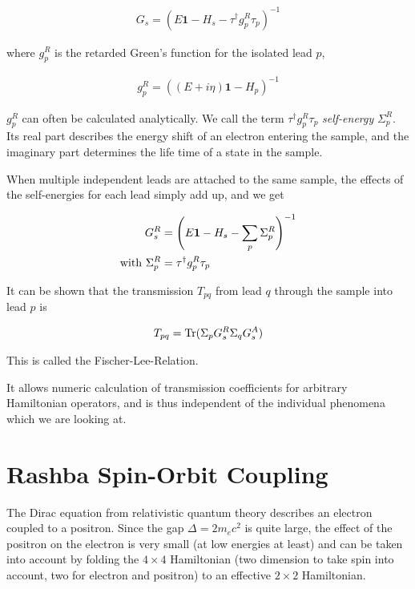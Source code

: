 \documentclass[11pt,twoside]{book}
\newcommand{\trace}{\textnormal{Tr}}
\begin{document}
\begin{align}
    G_s = (E\mathbf1 - H_s - \tau^\dagger g_p^R \tau_p )^{-1}
\end{align}

where $g_p^R$ is the retarded Green's function for the isolated lead $p$,

\begin{align}
    g_p^R = ((E+i\eta)\mathbf1 - H_p)^{-1}
\end{align}

$g_p^R$ can often be calculated analytically. We call the term $\tau^\dagger
g_p^R \tau_p$ \emph{self-energy} $\Sigma^R_p$. Its real part describes the
energy shift of an electron entering the sample, and the imaginary part
determines the life time of a state in the sample.

When multiple independent leads are attached
to the same sample, the effects of the self-energies for each lead simply add
up, and we get

\begin{align}
    G_s^R &= \left(E\mathbf1 - H_s - \sum_p \Sigma^R_p\right)^{-1} \\
    \textnormal{with } \Sigma^R_p &= \tau^\dagger g_p^R \tau_p
\end{align}

It can be shown \cite{fischer-lee,baranger} that the transmission $T_{pq}$ from lead
$q$ through the sample into lead $p$ is

\begin{align}
    T_{pq} = \trace(\Sigma_p G_s^R \Sigma_q G_s^A)
\end{align}

This is called the Fischer-Lee-Relation.

It allows numeric calculation of transmission coefficients for
arbitrary Hamiltonian operators, and is thus independent of the individual
phenomena which we are looking at.

\section{Rashba Spin-Orbit Coupling}

The Dirac equation from relativistic quantum theory describes an electron
coupled to a positron. Since the gap $\Delta = 2 m_e c^2$ is quite large, the
effect of the positron on the electron is very small (at low energies at
least) and can be
taken into account by folding the $4\times4$ Hamiltonian (two dimension to
take spin into account, two for electron and positron) to an effective
$2\times 2$ Hamiltonian.
\end{document}
